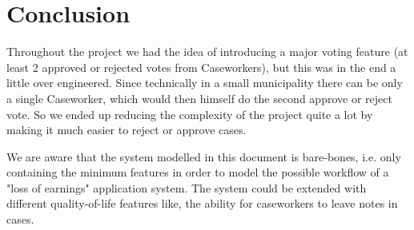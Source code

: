 \section{Conclusion}

Throughout the project we had the idea of introducing a major voting feature (at least 2 approved or rejected votes from Caseworkers), but this was in the end a little over engineered.
Since technically in a small municipality there can be only a single Caseworker, which would then himself do the second approve or reject vote.
So we ended up reducing the complexity of the project quite a lot by making it much easier to reject or approve cases.

\vspace{2mm}

We are aware that the system modelled in this document is bare-bones, i.e. only containing the minimum features in order to model the possible workflow of a "loss of earnings" application system. The system could be extended with different quality-of-life features like, the ability for caseworkers to leave notes in cases.